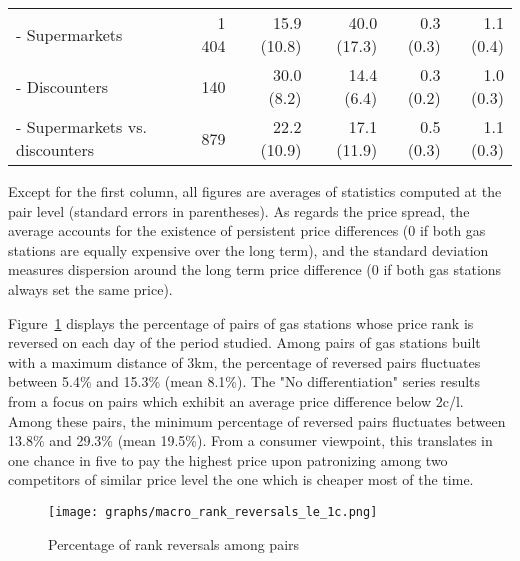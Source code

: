 \documentclass[english]{article}
\begin{document}
\begin{table}
\begin{threeparttable}
\begin{tabular}{lrrrrr}
    \hspace*{4mm} - Supermarkets & 1 404 & 15.9 (10.8) & 40.0 (17.3) & 0.3 (0.3) & 1.1 (0.4) \\
    \hspace*{4mm} - Discounters & 140   & 30.0 \phantom{0}(8.2) & 14.4 \phantom{0}(6.4) & 0.3 (0.2) & 1.0 (0.3) \\
    \hspace*{4mm} - Supermarkets vs. discounters & 879   & 22.2 (10.9) & 17.1 (11.9) & 0.5 (0.3) & 1.1 (0.3) \\
    \bottomrule
    \bottomrule
\end{tabular}
\begin{tablenotes}
			\small
      \item Except for the first column, all figures are averages of statistics computed at the pair level (standard errors in parentheses). As regards the price spread, the average accounts for the existence of persistent price differences (0 if both gas stations are equally expensive over the long term), and the standard deviation measures dispersion around the long term price difference (0 if both gas stations always set the same price).
\end{tablenotes}
\end{threeparttable}
\end{table}

Figure~\ref{fig:pct_reversed_pairs} displays the percentage of pairs of gas stations whose price rank is reversed on each day of the period studied. Among pairs of gas stations built with a maximum distance of 3km, the percentage of reversed pairs fluctuates between 5.4\% and 15.3\%  (mean 8.1\%). The "No differentiation" series results from a focus on pairs which exhibit an average price difference below 2c/l. Among these pairs, the minimum percentage of reversed pairs fluctuates between 13.8\% and 29.3\% (mean 19.5\%). From a consumer viewpoint, this translates in one chance in five to pay the highest price upon patronizing among two competitors of similar price level the one which is cheaper most of the time.

\begin{figure}[htb!]
    \caption{Percentage of rank reversals among pairs}
    \label{fig:pct_reversed_pairs}
	\centering
		\texttt{[image: graphs/macro\_rank\_reversals\_le\_1c.png]}
\end{figure}
\end{document}
